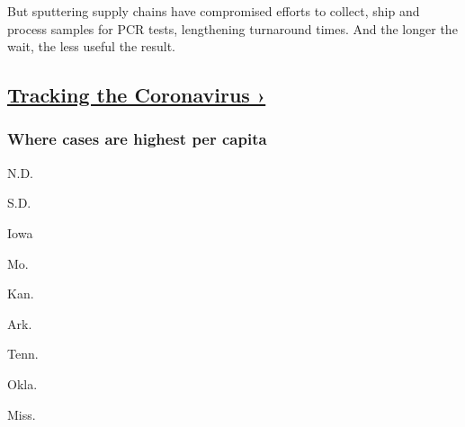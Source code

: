 But sputtering supply chains have compromised efforts to collect, ship
and process samples for PCR tests, lengthening turnaround times. And the
longer the wait, the less useful the result.

\hypertarget{tracking-the-coronavirus-}{%
\subsection{\texorpdfstring{\href{https://www.nytimes3xbfgragh.onion/interactive/2020/us/coronavirus-us-cases.html}{Tracking
the Coronavirus
›}}{Tracking the Coronavirus ›}}\label{tracking-the-coronavirus-}}

\href{https://www.nytimes3xbfgragh.onion/interactive/2020/us/coronavirus-us-cases.html}{}

\hypertarget{where-cases-are-highest-per-capita}{%
\subsubsection{\texorpdfstring{Where cases are \textbf{highest} per
capita}{Where cases are highest per capita}}\label{where-cases-are-highest-per-capita}}

\href{https://www.nytimes3xbfgragh.onion/interactive/2020/us/north-dakota-coronavirus-cases.html}{}

N.D.
\href{https://www.nytimes3xbfgragh.onion/interactive/2020/us/south-dakota-coronavirus-cases.html}{}

S.D.
\href{https://www.nytimes3xbfgragh.onion/interactive/2020/us/iowa-coronavirus-cases.html}{}

Iowa
\href{https://www.nytimes3xbfgragh.onion/interactive/2020/us/missouri-coronavirus-cases.html}{}

Mo.
\href{https://www.nytimes3xbfgragh.onion/interactive/2020/us/kansas-coronavirus-cases.html}{}

Kan.
\href{https://www.nytimes3xbfgragh.onion/interactive/2020/us/arkansas-coronavirus-cases.html}{}

Ark.
\href{https://www.nytimes3xbfgragh.onion/interactive/2020/us/tennessee-coronavirus-cases.html}{}

Tenn.
\href{https://www.nytimes3xbfgragh.onion/interactive/2020/us/oklahoma-coronavirus-cases.html}{}

Okla.
\href{https://www.nytimes3xbfgragh.onion/interactive/2020/us/mississippi-coronavirus-cases.html}{}

Miss.
\href{https://www.nytimes3xbfgragh.onion/interactive/2020/us/illinois-coronavirus-cases.html}{}

